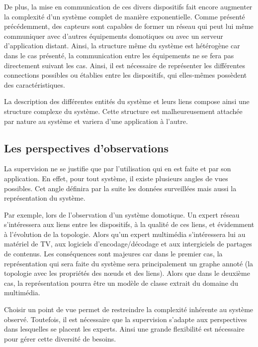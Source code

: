De plus, la mise en communication de ces divers dispositifs fait encore augmenter la complexité d'un système complet de manière exponentielle. Comme présenté précédemment, des capteurs sont capables de former un réseau qui peut lui même communiquer avec d'autres équipements domotiques ou avec un serveur d'application distant. Ainsi, la structure même du système est hétérogène car dans le cas présenté, la communication entre les équipements ne se fera pas directement suivant les cas. Ainsi, il est nécessaire de représenter les différentes connections possibles ou établies entre les dispositifs, qui elles-mêmes possèdent des caractéristiques. 

La description des différentes entités du système et leurs liens compose ainsi une structure complexe du système. Cette structure est malheureusement attachée par nature au système et variera d'une application à l'autre.

\subsection{Les perspectives d'observations}\label{sec:intro:problematique:observation}
La supervision ne se justifie que par l'utilisation qui en est faite et par son application. En effet, pour tout système, il existe plusieurs angles de vues possibles. Cet angle définira par la suite les données surveillées mais aussi la représentation du système.

Par exemple, lors de l'observation d'un système domotique. Un expert réseau s'intéressera aux liens entre les dispositifs, à la qualité de ces liens, et évidemment à l'évolution de la topologie. Alors qu'un expert multimédia s'intéressera lui au matériel de TV, aux logiciels d'encodage/décodage et aux intergiciels de partages de contenus. Les conséquences sont majeures car dans le premier cas, la représentation qui sera faite du système sera principalement un graphe annoté (la topologie avec les propriétés des nœuds et des liens). Alors que dans le deuxième cas, la représentation pourra être un modèle de classe extrait du domaine du multimédia.

Choisir un point de vue permet de restreindre la complexité inhérente au système observé. Toutefois, il est nécessaire que la supervision s'adapte aux perspectives dans lesquelles se placent les experts. Ainsi une grande flexibilité est nécessaire pour gérer cette diversité de besoins.

